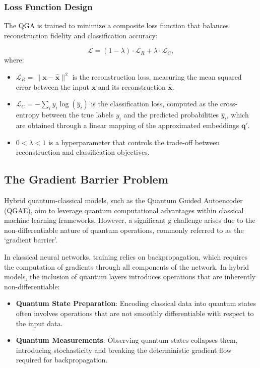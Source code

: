\documentclass[conference]{IEEEtran}
\begin{document}
\subsubsection{Loss Function Design}
The QGA is trained to minimize a composite loss 
function that balances reconstruction fidelity and 
classification accuracy:

\begin{equation}
    \mathcal{L} = (1-\lambda) \cdot \mathcal{L}_R + \lambda \cdot \mathcal{L}_{C},
    \label{eq:composed_loss_function}
\end{equation}
where:
\begin{itemize}
    \item \( \mathcal{L}_R = \| \mathbf{x} - \hat{\mathbf{x}} \|^2 \) is the reconstruction loss, measuring the mean squared error between the input \( \mathbf{x} \) and its reconstruction \( \mathbf{\hat{x}} \).
    \item \( \mathcal{L}_C = -\sum_i y_i \log(\hat{y}_i) \) is the classification loss, computed as the cross-entropy between the true labels \( y_i \) and the predicted probabilities \( \hat{y}_i \), which are obtained through a linear mapping of the 
    approximated embeddings \(\mathbf{q}'\).
    \item \( 0 < \lambda < 1 \) is a hyperparameter that controls the trade-off between reconstruction and classification objectives.
\end{itemize}    
\subsection{The Gradient Barrier Problem}
Hybrid quantum-classical models, such as the Quantum Guided Autoencoder 
(QGAE), aim to leverage quantum computational advantages within 
classical machine learning frameworks. However, a significant g
challenge arises due to the non-differentiable nature of quantum 
operations, commonly referred to as the `gradient barrier'.

In classical neural networks, training relies on backpropagation, 
which requires the computation of gradients through all components 
of the network. In hybrid models, the inclusion of quantum 
layers introduces operations that are inherently non-differentiable:

\begin{itemize}
    \item \textbf{Quantum State Preparation}: 
    Encoding classical data into 
    quantum states often involves operations 
    that are not smoothly differentiable with 
    respect to the input data.
    
    \item \textbf{Quantum Measurements}:
    Observing quantum states collapses them, 
    introducing stochasticity and breaking the 
    deterministic gradient flow required 
    for backpropagation.
\end{itemize}
\end{document}
